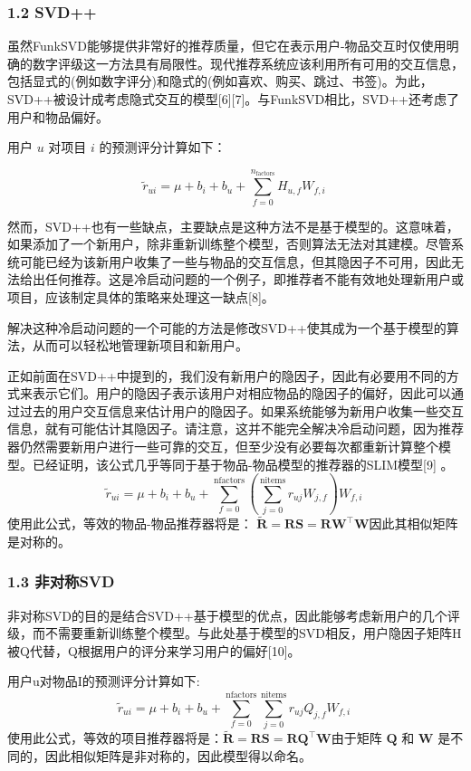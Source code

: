 \subsubsection{1.2 SVD++}
虽然FunkSVD能够提供非常好的推荐质量，但它在表示用户-物品交互时仅使用明确的数字评级这一方法具有局限性。现代推荐系统应该利用所有可用的交互信息，包括显式的(例如数字评分)和隐式的(例如喜欢、购买、跳过、书签)。为此，SVD++被设计成考虑隐式交互的模型[6][7]。与FunkSVD相比，SVD++还考虑了用户和物品偏好。

用户 $u$ 对项目 $i$ 的预测评分计算如下：

$$\tilde{r}_{ui} = \mu + b_i + b_u + \sum_{f=0}^{n_{\text{factors}}} H_{u,f} W_{f,i}~$$

然而，SVD++也有一些缺点，主要缺点是这种方法不是基于模型的。这意味着，如果添加了一个新用户，除非重新训练整个模型，否则算法无法对其建模。尽管系统可能已经为该新用户收集了一些与物品的交互信息，但其隐因子不可用，因此无法给出任何推荐。这是冷启动问题的一个例子，即推荐者不能有效地处理新用户或项目，应该制定具体的策略来处理这一缺点[8]。

解决这种冷启动问题的一个可能的方法是修改SVD++使其成为一个基于模型的算法，从而可以轻松地管理新项目和新用户。

正如前面在SVD++中提到的，我们没有新用户的隐因子，因此有必要用不同的方式来表示它们。用户的隐因子表示该用户对相应物品的隐因子的偏好，因此可以通过过去的用户交互信息来估计用户的隐因子。如果系统能够为新用户收集一些交互信息，就有可能估计其隐因子。请注意，这并不能完全解决冷启动问题，因为推荐器仍然需要新用户进行一些可靠的交互，但至少没有必要每次都重新计算整个模型。已经证明，该公式几乎等同于基于物品-物品模型的推荐器的SLIM模型[9] 。
$$\tilde{r}_{ui} = \mu + b_i + b_u + \sum_{f=0}^{\text{nfactors}} \left( \sum_{j=0}^{\text{nitems}} r_{uj} W_{j,f} \right) W_{f,i}~$$
使用此公式，等效的物品-物品推荐器将是：
$\tilde{\mathbf{R}} = \mathbf{R} \mathbf{S} = \mathbf{R} \mathbf{W}^\top \mathbf{W}$因此其相似矩阵是对称的。
\subsubsection{1.3 非对称SVD}
非对称SVD的目的是结合SVD++基于模型的优点，因此能够考虑新用户的几个评级，而不需要重新训练整个模型。与此处基于模型的SVD相反，用户隐因子矩阵H被Q代替，Q根据用户的评分来学习用户的偏好[10]。

用户u对物品I的预测评分计算如下:
$$\tilde{r}_{ui} = \mu + b_i + b_u + \sum_{f=0}^{\text{nfactors}} \sum_{j=0}^{\text{nitems}} r_{uj} Q_{j,f} W_{f,i}~$$
使用此公式，等效的项目推荐器将是：$\tilde{\mathbf{R}} = \mathbf{R} \mathbf{S} = \mathbf{R} \mathbf{Q}^\top \mathbf{W}$由于矩阵 $\mathbf{Q}$ 和 $\mathbf{W}$ 是不同的，因此相似矩阵是非对称的，因此模型得以命名。

